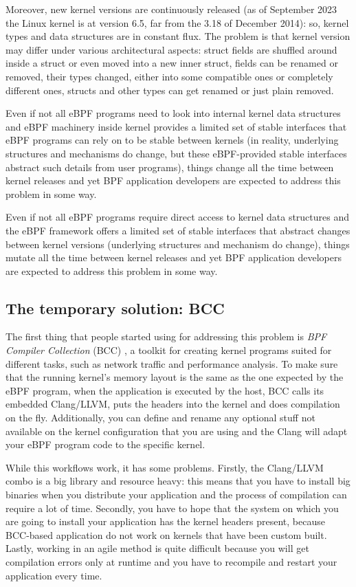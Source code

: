 Moreover, new kernel versions are continuously released (as of September 2023 the Linux kernel is at version 6.5, far from the 3.18 of December 2014): so, kernel types and data structures are in constant flux.
The problem is that kernel version may differ under various architectural aspects: struct fields are shuffled around inside a struct or even moved into a new inner struct, fields can be renamed or removed, their types changed, either into some compatible ones or completely different ones, structs and other types can get renamed or just plain removed.

Even if not all eBPF programs need to look into internal kernel data structures and eBPF machinery inside kernel provides a limited set of stable interfaces that eBPF programs can rely on to be stable between kernels (in reality, underlying structures and mechanisms do change, but these eBPF-provided stable interfaces abstract such details from user programs), things change all the time between kernel releases and yet BPF application developers are expected to address this problem in some way. 

Even if not all eBPF programs require direct access to kernel data structures and the eBPF framework offers a limited set of stable interfaces that abstract changes between kernel versions (underlying structures and mechanism do change), things mutate all the time between kernel releases and yet BPF application developers are expected to address this problem in some way. 

\subsection{The temporary solution: BCC}

The first thing that people started using for addressing this problem is \textit{BPF Compiler Collection} (BCC) \cite{BCCGitHub}, a toolkit for creating kernel programs suited for different tasks, such as network traffic and performance analysis.
To make sure that the running kernel's memory layout is the same as the one expected by the eBPF program, when the application is executed by the host, BCC calls its embedded Clang/LLVM, puts the headers into the kernel and does compilation on the fly.
Additionally, you can define and rename any optional stuff not available on the kernel configuration that you are using and the Clang will adapt your eBPF program code to the specific kernel.

While this workflows work, it has some problems.
Firstly, the Clang/LLVM combo is a big library and resource heavy: this means that you have to install big binaries when you distribute your application and the process of compilation can require a lot of time.
Secondly, you have to hope that the system on which you are going to install your application has the kernel headers present, because BCC-based application do not work on kernels that have been custom built.
Lastly, working in an agile method is quite difficult because you will get compilation errors only at runtime and you have to recompile and restart your application every time.

